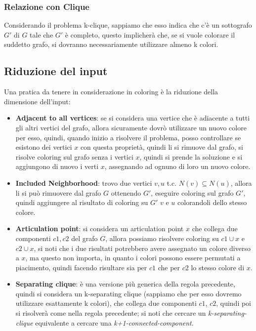 \documentclass[12pt,a4paper]{article}
\begin{document}
\subsubsection{Relazione con Clique}
Considerando il problema k-clique, sappiamo che esso indica che c'è un sottografo $G'$ di $G$ tale che $G'$ è completo, questo implicherà che, se si vuole colorare il suddetto grafo, si dovranno necessariamente utilizzare almeno k colori.

\subsection{Riduzione del input}
Una pratica da tenere in considerazione in coloring è la riduzione della dimensione dell'input:
\begin{itemize}
\item \textbf{Adjacent to all vertices}: se si considera una vertice che è adiacente a tutti gli altri vertici del grafo, allora sicuramente dovrò utilizzare un nuovo colore per esso, quindi, quando inizio a risolvere il problema, posso controllare se esistono dei vertici $x$ con questa proprietà, quindi li si rimuove dal grafo, si risolve coloring sul grafo senza i vertici $x$, quindi si prende la soluzione e si aggiungono di nuovo i verti $x$, assegnando ad ognuno di loro un nuovo colore.
\item \textbf{Included Neighborhood}: trovo due vertici $v, u$ t.c. $N(v) \subseteq N(u)$, allora li si può rimuovere dal grafo $G$ ottenendo $G'$, eseguire coloring sul grafo $G'$, quindi aggiungere al risultato di coloring su  $G'$ $v$ e $u$ colorandoli dello stesso colore.
\item \textbf{Articulation point}: si considera un articulation point $x$ che collega due componenti $c1, c2$ del grafo $G$, allora possiamo risolvere coloring su $c1 \cup x$ e $c2 \cup x$, si noti che i due risultati potrebbero avere assegnato un colore diverso a $x$, ma questo non importa, in quanto i colori possono essere permutati a piacimento, quindi facendo risultare sia per $c1$ che per $c2$ lo stesso colore di $x$.
\item \textbf{Separating clique}: è una versione più generica della regola precedente, quindi si considera un k-separating clique (sappiamo che per esso dovremo utilizzare esattamente k colori), che collega due componenti $c1$, $c2$, quindi poi si risolverà come nella regola precedente; si noti che cercare un \textit{k-separating-clique} equivalente a cercare una \textit{k+1-connected-component}.
\end{itemize}
\end{document}
